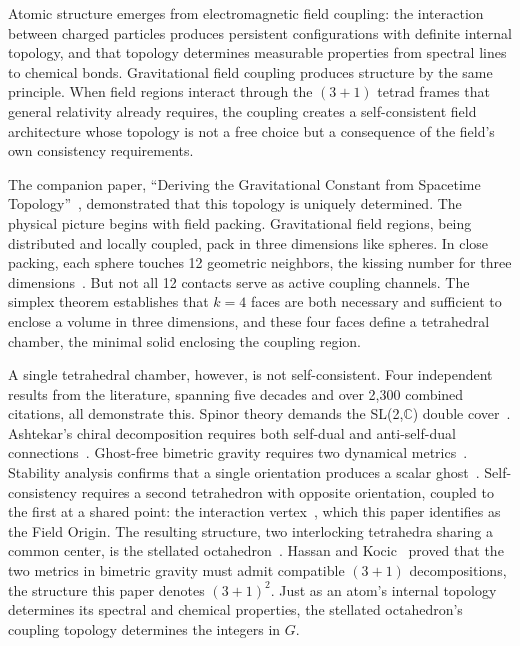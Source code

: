 \documentclass[aps,prd,preprint,superscriptaddress,showpacs,preprintnumbers,amsmath,amssymb,nofootinbib]{revtex4-2}
\begin{document}
Atomic structure emerges from electromagnetic field coupling: the interaction between charged particles produces persistent configurations with definite internal topology, and that topology determines measurable properties from spectral lines to chemical bonds. Gravitational field coupling produces structure by the same principle. When field regions interact through the $(3{+}1)$ tetrad frames that general relativity already requires, the coupling creates a self-consistent field architecture whose topology is not a free choice but a consequence of the field's own consistency requirements.

The companion paper, ``Deriving the Gravitational Constant from Spacetime Topology''~\cite{paper6}, demonstrated that this topology is uniquely determined. The physical picture begins with field packing. Gravitational field regions, being distributed and locally coupled, pack in three dimensions like spheres. In close packing, each sphere touches 12 geometric neighbors, the kissing number for three dimensions~\cite{hales2005}. But not all 12 contacts serve as active coupling channels. The simplex theorem establishes that $k = 4$ faces are both necessary and sufficient to enclose a volume in three dimensions, and these four faces define a tetrahedral chamber, the minimal solid enclosing the coupling region.

A single tetrahedral chamber, however, is not self-consistent. Four independent results from the literature, spanning five decades and over 2,300 combined citations, all demonstrate this. Spinor theory demands the SL(2,$\mathbb{C}$) double cover~\cite{weinberg1995,geroch1968}. Ashtekar's chiral decomposition requires both self-dual and anti-self-dual connections~\cite{ashtekar1986}. Ghost-free bimetric gravity requires two dynamical metrics~\cite{hassan2012}. Stability analysis confirms that a single orientation produces a scalar ghost~\cite{alexander2014}. Self-consistency requires a second tetrahedron with opposite orientation, coupled to the first at a shared point: the interaction vertex~\cite{hassan2012,deffayet2013}, which this paper identifies as the Field Origin. The resulting structure, two interlocking tetrahedra sharing a common center, is the stellated octahedron~\cite{coxeter1973}. Hassan and Kocic~\cite{hassankocic2018} proved that the two metrics in bimetric gravity must admit compatible $(3{+}1)$ decompositions, the structure this paper denotes $(3{+}1)^2$. Just as an atom's internal topology determines its spectral and chemical properties, the stellated octahedron's coupling topology determines the integers in $G$.
\end{document}
